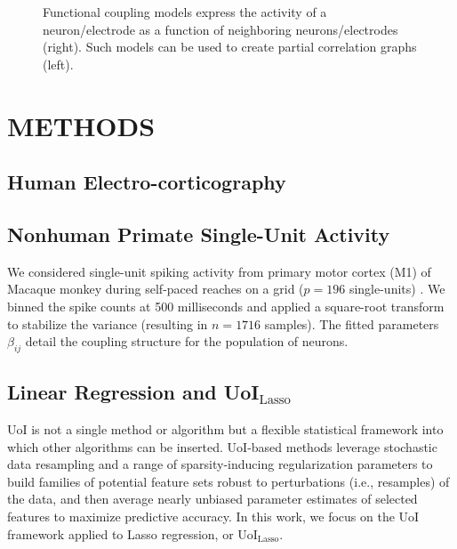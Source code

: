 \documentclass[letterpaper, 10 pt, conference]{ieeeconf}  %
\begin{document}
\begin{figure}[t]
    \centering
    \caption{Functional coupling models express the activity of a neuron/electrode as a function of neighboring neurons/electrodes (right). Such models can be used to create partial correlation graphs (left).}
    \label{fig:functional_coupling}
\end{figure}

\section{METHODS}
\subsection{Human Electro-corticography}

\subsection{Nonhuman Primate Single-Unit Activity}
We considered single-unit spiking activity from primary motor cortex (M1) of Macaque monkey during self-paced reaches on a grid ($p=196$ single-units) \cite{nhp}. We binned the spike counts at 500 milliseconds and applied a square-root transform to stabilize the variance (resulting in $n=1716$ samples). The fitted parameters $\beta_{ij}$ detail the coupling structure for the population of neurons.

\subsection{Linear Regression and UoI$_{\text{Lasso}}$}
UoI is not a single method or algorithm but a flexible statistical framework into which other algorithms can be inserted. UoI-based methods leverage stochastic data resampling and a range of sparsity-inducing regularization parameters to build families of potential feature sets robust to perturbations (i.e., resamples) of the data, and then average nearly unbiased parameter estimates of selected features to maximize predictive accuracy. In this work, we focus on the UoI framework applied to Lasso regression, or UoI$_{\text{Lasso}}$.
\end{document}
